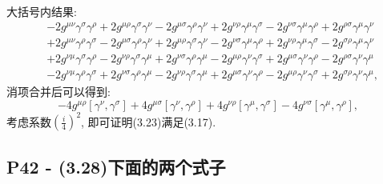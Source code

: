 \documentclass[10pt,b5paper,openany]{book}
\begin{document}
大括号内结果: 
\begin{equation}
  \begin{aligned}
    &- 2g^{\mu\nu}\gamma^\sigma \gamma^\rho + 2g^{\mu\rho}\gamma^\sigma \gamma^\nu - 2g^{\mu\sigma}\gamma^\rho \gamma^\nu + 2g^{\nu\rho}\gamma^\mu \gamma^\sigma - 2g^{\nu\sigma}\gamma^\mu \gamma^\rho + 2g^{\rho\sigma}\gamma^\mu \gamma^\nu \\
    &+ 2g^{\mu\nu}\gamma^\rho \gamma^\sigma - 2g^{\mu\sigma}\gamma^\rho \gamma^\nu + 2g^{\mu\rho}\gamma^\sigma \gamma^\nu - 2g^{\nu\sigma}\gamma^\mu \gamma^\rho + 2g^{\nu\rho}\gamma^\mu \gamma^\sigma - 2g^{\sigma\rho}\gamma^\mu \gamma^\nu \\
    &+ 2g^{\nu\mu}\gamma^\sigma \gamma^\rho - 2g^{\nu\rho}\gamma^\sigma \gamma^\mu + 2g^{\nu\sigma}\gamma^\rho \gamma^\mu - 2g^{\mu\rho}\gamma^\nu \gamma^\sigma + 2g^{\mu\sigma}\gamma^\nu \gamma^\rho - 2g^{\rho\sigma}\gamma^\nu \gamma^\mu \\
    &- 2g^{\nu\mu}\gamma^\rho \gamma^\sigma + 2g^{\nu\sigma}\gamma^\rho \gamma^\mu - 2g^{\nu\rho}\gamma^\sigma \gamma^\mu + 2g^{\mu\sigma}\gamma^\nu \gamma^\rho - 2g^{\mu\rho}\gamma^\nu \gamma^\sigma + 2g^{\sigma\rho}\gamma^\nu \gamma^\mu,  
  \end{aligned}
\end{equation}
消项合并后可以得到: 
\begin{equation}
  -4g^{\mu\rho}[\gamma^\nu, \gamma^\sigma] + 4g^{\mu\sigma}[\gamma^\nu, \gamma^\rho] + 4g^{\nu\rho}[\gamma^\mu, \gamma^\sigma] - 4g^{\nu\sigma}[\gamma^\mu, \gamma^\rho],  
\end{equation}
考虑系数$(\frac{i}{4})^2$, 即可证明(3.23)满足(3.17).

\subsection{P42 - (3.28)下面的两个式子}
\end{document}
